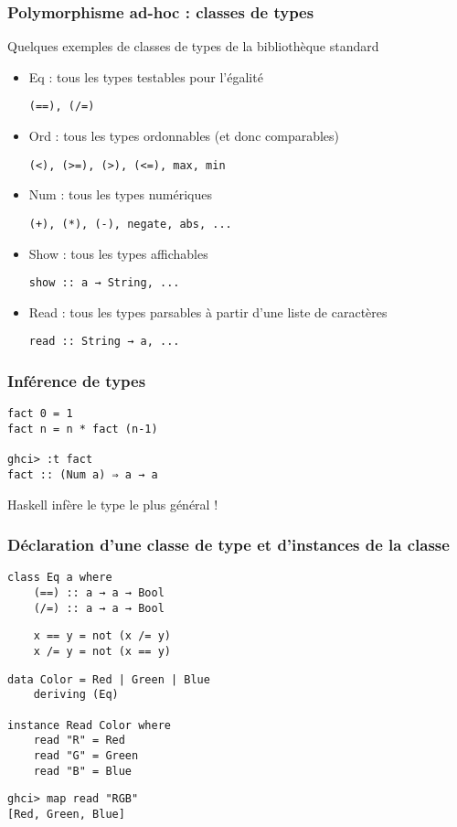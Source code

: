 \documentclass[10pt]{beamer}
\begin{document}
\begin{frame}[fragile]
\frametitle{Polymorphisme ad-hoc : classes de types}
\begin{block}
{Quelques exemples de classes de types de la bibliothèque standard}
\begin{itemize}

\item Eq : tous les types testables pour l'égalité

\verb|(==), (/=)|

\item Ord : tous les types ordonnables (et donc comparables)

\verb|(<), (>=), (>), (<=), max, min|

\item Num : tous les types numériques

\verb|(+), (*), (-), negate, abs, ...|

\item Show : tous les types affichables

\verb|show :: a → String, ...|

\item Read : tous les types parsables à partir d'une liste de caractères

\verb|read :: String → a, ...|

\end{itemize}
\end{block}
\end{frame}



\begin{frame}[fragile]
\frametitle{Inférence de types}

\begin{verbatim}
fact 0 = 1
fact n = n * fact (n-1)

ghci> :t fact
fact :: (Num a) ⇒ a → a
\end{verbatim}

Haskell infère le type le plus général !
\end{frame}



\begin{frame}[fragile]
\frametitle{Déclaration d'une classe de type et d'instances de la classe}
\begin{verbatim}
class Eq a where
    (==) :: a → a → Bool
    (/=) :: a → a → Bool
\end{verbatim}
\pause
\begin{verbatim}
    x == y = not (x /= y)
    x /= y = not (x == y)
\end{verbatim}
\pause
\begin{verbatim}
data Color = Red | Green | Blue
    deriving (Eq)

instance Read Color where
    read "R" = Red
    read "G" = Green
    read "B" = Blue
\end{verbatim}
\pause
\begin{verbatim}
ghci> map read "RGB"
[Red, Green, Blue]
\end{verbatim}
\end{frame}
\end{document}
